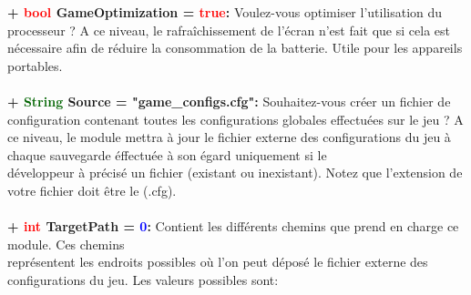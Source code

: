 \documentclass[a4paper, 11pt]{article}
\begin{document}
	\textbf{+ \textcolor{red}{bool} GameOptimization = \textcolor{red}{true}:} Voulez-vous optimiser 
	l'utilisation du processeur ? A ce niveau, le rafraîchissement de l'écran n'est fait que si cela est
	nécessaire afin de réduire la consommation de la batterie. Utile pour les appareils portables.\\\\
	\textbf{+ \textcolor{darkgreen}{String} Source = "game\_configs.cfg":} Souhaitez-vous créer un fichier 
	de configuration contenant toutes les configurations globales effectuées sur le jeu ? A ce niveau, le 
	module mettra à jour le fichier externe des configurations du jeu à chaque sauvegarde éffectuée à son 
	égard uniquement si le \\développeur à précisé un fichier (existant ou inexistant). Notez que 
	l'extension de votre fichier doit être le (.cfg).\\\\
	\textbf{+ \textcolor{red}{int} TargetPath = \textcolor{blue}{0}:} Contient les différents chemins que
	prend en charge ce module. Ces chemins \\représentent les endroits possibles où l'on peut déposé le
	fichier externe des configurations du jeu. Les valeurs possibles sont:
\end{document}
